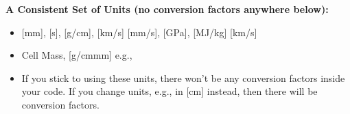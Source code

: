 \documentclass[11pt,addpoints]{exam}
\begin{document}
\begin{tcolorbox}[breakable]
\textbf{A Consistent Set of Units (no conversion factors anywhere below):}\vspace{.5em}
\begin{itemize}
\item {} [mm], \hspace{2mm}  [\bm{$\mu$}s], \hspace{2mm} \bm{$\rho$} [g/cm], \hspace{2mm}  [km/s] \bm{$=$} [mm/\bm{$\mu$}s], \hspace{2mm}  [GPa], \hspace{2mm}  [MJ/kg] \bm{$=$} [km/s]\vspace{.5em}
\item Cell Mass, \hspace{3mm}  [g/cm\bm{$^3\cdot$}mm] \hspace{5mm} e.g., \vspace{.5em}
\item If you stick to using these units, there won't be any conversion factors inside your code. If you change units, e.g.,  in [cm] instead, then there will be conversion factors.
\end{itemize}
\end{tcolorbox}

\clearpage
\end{document}

